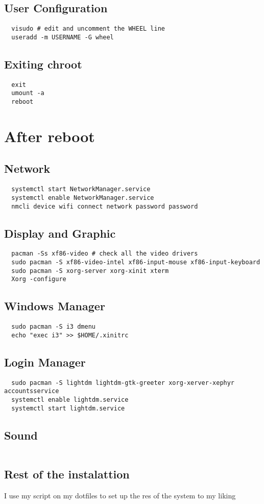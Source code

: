 \documentclass{article}
\begin{document}
\subsection{User Configuration}
\begin{lstlisting}
  visudo # edit and uncomment the WHEEL line
  useradd -m USERNAME -G wheel
\end{lstlisting}

\subsection{Exiting chroot}
\begin{lstlisting}
  exit
  umount -a
  reboot
\end{lstlisting}

\section{After reboot}

\subsection{Network}
\begin{lstlisting}
  systemctl start NetworkManager.service
  systemctl enable NetworkManager.service
  nmcli device wifi connect network password password
\end{lstlisting}


\subsection{Display and Graphic}
\begin{lstlisting}
  pacman -Ss xf86-video # check all the video drivers
  sudo pacman -S xf86-video-intel xf86-input-mouse xf86-input-keyboard
  sudo pacman -S xorg-server xorg-xinit xterm
  Xorg -configure
\end{lstlisting}

\subsection{Windows Manager}
\begin{lstlisting}
  sudo pacman -S i3 dmenu
  echo "exec i3" >> $HOME/.xinitrc
\end{lstlisting}

\subsection{Login Manager}
\begin{lstlisting}
  sudo pacman -S lightdm lightdm-gtk-greeter xorg-xerver-xephyr accountsservice
  systemctl enable lightdm.service
  systemctl start lightdm.service
\end{lstlisting}

\subsection{Sound}
\begin{lstlisting}
\end{lstlisting}

\subsection{Rest of the instalattion}
I use my script on my dotfiles to set up the res of the system to my liking
\end{document}
